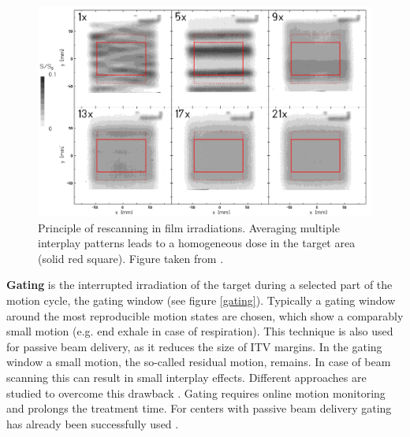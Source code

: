 \begin{figure}[H]
\begin{center}
\includegraphics[scale=0.45]{./teile/introduction/rescanning.png}
\caption{Principle of rescanning in film irradiations. Averaging multiple interplay patterns leads to a homogeneous dose in the target area 
(solid red square). Figure taken from \cite{Ber09b}. }
\label{rescanning}
\end{center}
\end{figure}

\textbf{Gating} is the interrupted irradiation of the target during a selected part of the motion cycle, the gating window \cite{Kub96, Min00} 
\cite{Li06} (see figure \ref{gating}). Typically a gating window around the most reproducible motion states are chosen, which show a comparably 
small motion (e.g. end exhale in case of respiration). This technique is also used for passive beam delivery, as it reduces the size 
of ITV margins. In the gating window a small motion, the so-called residual motion, remains. In case of beam scanning this can result in 
small interplay effects. Different approaches are studied to overcome this drawback \cite{Fur07, Zen10, Ber09}. Gating requires 
online motion monitoring and prolongs the treatment time. For centers with passive beam delivery gating has already been successfully 
used \cite{Min00, Iwa10, Has06}.


